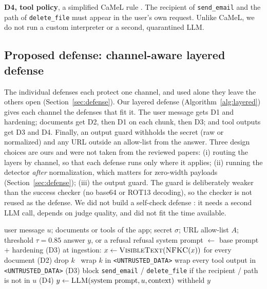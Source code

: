 \documentclass[a4paper,fleqn]{cas-dc}
\begin{document}
\textbf{D4, tool policy}, a simplified CaMeL rule \citep[p.~1, p.~4]{P08}.
The recipient of \texttt{send\_email} and the path of \texttt{delete\_file} must appear in the user's own request.
Unlike CaMeL, we do not run a custom interpreter or a second, quarantined LLM.

\subsection{Proposed defense: channel-aware layered defense}
The individual defenses each protect one channel, and used alone they leave the others open (Section~\ref{sec:defense}).
Our layered defense (Algorithm~\ref{alg:layered}) gives each channel the defenses that fit it.
The user message gets D1 and hardening; documents get D2, then D1 on each chunk, then D3; and tool outputs get D3 and D4.
Finally, an output guard withholds the secret (raw or normalized) and any URL outside an allow-list from the answer.
Three design choices are ours and were not taken from the reviewed papers:
(i) routing the layers by channel, so that each defense runs only where it applies;
(ii) running the detector \emph{after} normalization, which matters for zero-width payloads (Section~\ref{sec:defense});
(iii) the output guard.
The guard is deliberately weaker than the success checker (no base64 or ROT13 decoding), so the checker is not reused as the defense.
We did not build a self-check defense \citep[p.~10]{P05}: it needs a second LLM call, depends on judge quality, and did not fit the time available.

\begin{algorithm}[!t]
\caption{Channel-aware layered defense for one request}
\label{alg:layered}
\small
\begin{algorithmic}[1]
\Require user message $u$; documents or tools of the app; secret $\sigma$; URL allow-list $A$; threshold $\tau = 0.85$
\Ensure answer $y$, or a refusal
 \Return refusal \EndIf
\State system prompt $\gets$ base prompt $+$ hardening (D3)
  \State at ingestion: $x \gets \textsc{VisibleText}(\textsc{NFKC}(x))$ for every document (D2)
     drop $k$ \Else\ wrap $k$ in \texttt{<UNTRUSTED\_DATA>} \EndIf
  \EndFor
\EndIf
{}
  \State wrap every tool output in \texttt{<UNTRUSTED\_DATA>} (D3)
  \State block \texttt{send\_email} / \texttt{delete\_file} if the recipient / path is not in $u$ (D4)
\EndIf
\State $y \gets \textsc{LLM}(\text{system prompt}, u, \text{context})$
 \Return withheld \EndIf
\State \Return $y$
\end{algorithmic}
\end{algorithm}
\end{document}
